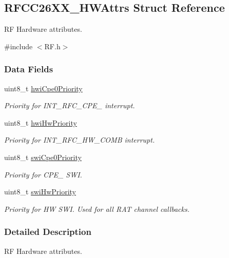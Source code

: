 \subsection{R\+F\+C\+C26\+X\+X\+\_\+\+H\+W\+Attrs Struct Reference}
\label{struct_r_f_c_c26_x_x___h_w_attrs}


R\+F Hardware attributes.  




{\ttfamily \#include $<$R\+F.\+h$>$}

\subsubsection*{Data Fields}
\begin{DoxyCompactItemize}
\item 
uint8\+\_\+t \hyperlink{struct_r_f_c_c26_x_x___h_w_attrs_a95ee6fdbd88bd23661ab430671b71ec6}{hwi\+Cpe0\+Priority}
\begin{DoxyCompactList}\small\item\em Priority for I\+N\+T\+\_\+\+R\+F\+C\+\_\+\+C\+P\+E\+\_ interrupt. \end{DoxyCompactList}\item 
uint8\+\_\+t \hyperlink{struct_r_f_c_c26_x_x___h_w_attrs_a821611ad694b1c1211fa5ede18d4ff08}{hwi\+Hw\+Priority}
\begin{DoxyCompactList}\small\item\em Priority for I\+N\+T\+\_\+\+R\+F\+C\+\_\+\+H\+W\+\_\+\+C\+O\+M\+B interrupt. \end{DoxyCompactList}\item 
uint8\+\_\+t \hyperlink{struct_r_f_c_c26_x_x___h_w_attrs_a86c41609a2d64c1f65c9dcfe8eeb3ef9}{swi\+Cpe0\+Priority}
\begin{DoxyCompactList}\small\item\em Priority for C\+P\+E\+\_ S\+W\+I. \end{DoxyCompactList}\item 
uint8\+\_\+t \hyperlink{struct_r_f_c_c26_x_x___h_w_attrs_a48e07869f1eb1619eb2e06cf4a602517}{swi\+Hw\+Priority}
\begin{DoxyCompactList}\small\item\em Priority for H\+W S\+W\+I. Used for all R\+A\+T channel callbacks. \end{DoxyCompactList}\end{DoxyCompactItemize}


\subsubsection{Detailed Description}
R\+F Hardware attributes. 



